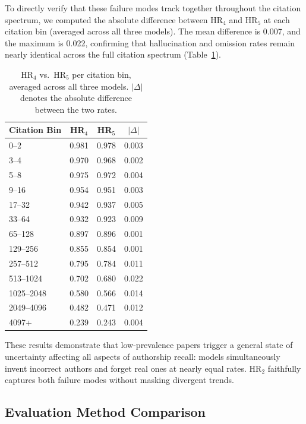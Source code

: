 \documentclass[11pt]{article}
\begin{document}
To directly verify that these failure modes track together throughout the citation spectrum, we computed the absolute difference between HR$_4$ and HR$_5$ at each citation bin (averaged across all three models). The mean difference is 0.007, and the maximum is 0.022, confirming that hallucination and omission rates remain nearly identical across the full citation spectrum (Table~\ref{tab:hr4_hr5_binwise}).

\begin{table}[tb!]
  \centering
  \setlength{\tabcolsep}{4pt}
  \begin{tabular}{@{}lccc@{}}
    \toprule
    \textbf{Citation Bin} & \textbf{HR$_4$} & \textbf{HR$_5$} & $|\Delta|$ \\
    \midrule
0--2        & 0.981 & 0.978 & 0.003 \\
3--4        & 0.970 & 0.968 & 0.002 \\
5--8        & 0.975 & 0.972 & 0.004 \\
9--16       & 0.954 & 0.951 & 0.003 \\
17--32      & 0.942 & 0.937 & 0.005 \\
33--64      & 0.932 & 0.923 & 0.009 \\
65--128     & 0.897 & 0.896 & 0.001 \\
129--256    & 0.855 & 0.854 & 0.001 \\
257--512    & 0.795 & 0.784 & 0.011 \\
513--1024   & 0.702 & 0.680 & 0.022 \\
1025--2048  & 0.580 & 0.566 & 0.014 \\
2049--4096  & 0.482 & 0.471 & 0.012 \\
4097+       & 0.239 & 0.243 & 0.004 \\
    \bottomrule
  \end{tabular}
  \caption{HR$_4$ vs.\ HR$_5$ per citation bin, averaged across all three models. $|\Delta|$ denotes the absolute difference between the two rates.}
  \label{tab:hr4_hr5_binwise}
\end{table}

These results demonstrate that low-prevalence papers trigger a general state of uncertainty affecting all aspects of authorship recall: models simultaneously invent incorrect authors and forget real ones at nearly equal rates. HR$_2$ faithfully captures both failure modes without masking divergent trends.

\subsection{Evaluation Method Comparison}
\label{sec:appendix_eval_comparison}
\end{document}
